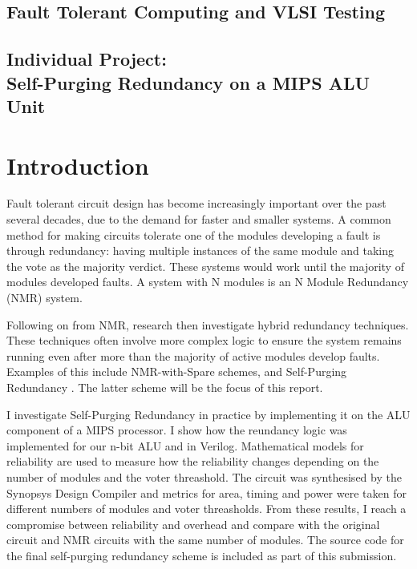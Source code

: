 \documentclass[a4paper,12pt]{article}
\begin{document}
    \begin{center}
        \section*{Fault Tolerant Computing and VLSI Testing}
        \subsection*{Individual Project:\\Self-Purging Redundancy on a MIPS ALU Unit}
    \end{center}

    \section{Introduction}
    Fault tolerant circuit design has become increasingly important over the past several decades, due to the demand for faster and smaller systems. A common method for making circuits tolerate one of the modules developing a fault is through redundancy: having multiple instances of the same module and taking the vote as the majority verdict. These systems would work until the majority of modules developed faults. A system with N modules is an N Module Redundancy (NMR) system.

    Following on from NMR, research then investigate hybrid redundancy techniques. These techniques often involve more complex logic to ensure the system remains running even after more than the majority of active modules develop faults. Examples of this include NMR-with-Spare schemes, and Self-Purging Redundancy \cite{1674656}. The latter scheme will be the focus of this report.

    I investigate Self-Purging Redundancy in practice by implementing it on the ALU component of a MIPS processor. I show how the reundancy logic was implemented for our n-bit ALU and in Verilog. Mathematical models for reliability are used to measure how the reliability changes depending on the number of modules and the voter threashold. The circuit was synthesised by the Synopsys Design Compiler and metrics for area, timing and power were taken for different numbers of modules and voter threasholds. From these results, I reach a compromise between reliability and overhead and compare with the original circuit and NMR circuits with the same number of modules. The source code for the final self-purging redundancy scheme is included as part of this submission.
\end{document}
